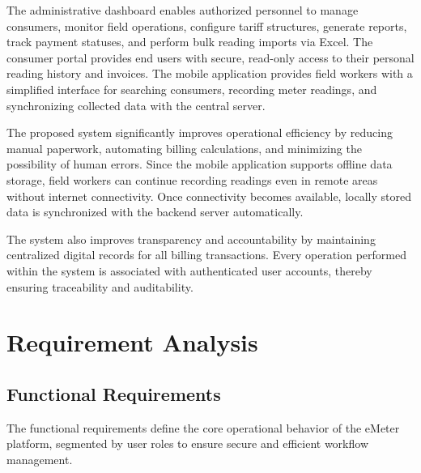 \documentclass[12pt, a4paper, onecolumn]{report}
\begin{document}
The administrative dashboard enables authorized personnel to manage consumers, monitor field operations, configure tariff structures, generate reports, track payment statuses, and perform bulk reading imports via Excel. The consumer portal provides end users with secure, read-only access to their personal reading history and invoices. The mobile application provides field workers with a simplified interface for searching consumers, recording meter readings, and synchronizing collected data with the central server.

The proposed system significantly improves operational efficiency by reducing manual paperwork, automating billing calculations, and minimizing the possibility of human errors. Since the mobile application supports offline data storage, field workers can continue recording readings even in remote areas without internet connectivity. Once connectivity becomes available, locally stored data is synchronized with the backend server automatically.

The system also improves transparency and accountability by maintaining centralized digital records for all billing transactions. Every operation performed within the system is associated with authenticated user accounts, thereby ensuring traceability and auditability.

\section{Requirement Analysis}

\subsection{Functional Requirements}
The functional requirements define the core operational behavior of the eMeter platform, segmented by user roles to ensure secure and efficient workflow management.
\end{document}
